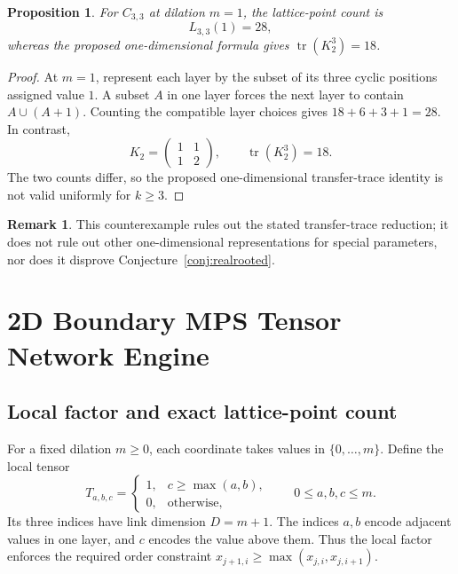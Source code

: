 \documentclass[11pt,a4paper]{article}
\newtheorem{proposition}[theorem]{Proposition}
\theoremstyle{definition}
\newtheorem{remark}[theorem]{Remark}
\begin{document}
\begin{proposition}\label{prop:transfer-counterexample}
For $C_{3,3}$ at dilation $m=1$, the lattice-point count is
\[
L_{3,3}(1)=28,
\]
whereas the proposed one-dimensional formula gives $\operatorname{tr}(K_2^3)=18$.
\end{proposition}

\begin{proof}
At $m=1$, represent each layer by the subset of its three cyclic positions assigned value $1$. A subset $A$ in one layer forces the next layer to contain $A\cup(A+1)$. Counting the compatible layer choices gives $18+6+3+1=28$. In contrast,
\[
K_2=\begin{pmatrix}1&1\\1&2\end{pmatrix},
\qquad \operatorname{tr}(K_2^3)=18.
\]
The two counts differ, so the proposed one-dimensional transfer-trace identity is not valid uniformly for $k\ge3$.
\end{proof}

\begin{remark}
This counterexample rules out the stated transfer-trace reduction; it does not rule out other one-dimensional representations for special parameters, nor does it disprove Conjecture~\ref{conj:realrooted}.
\end{remark}

\section{2D Boundary MPS Tensor Network Engine}

\subsection{Local factor and exact lattice-point count}

For a fixed dilation $m\ge0$, each coordinate takes values in $\{0,\ldots,m\}$. Define the local tensor
\begin{equation}\label{eq:local-tensor}
T_{a,b,c}=
\begin{cases}
1,&c\ge\max(a,b),\\
0,&\text{otherwise},
\end{cases}
\qquad 0\le a,b,c\le m.
\end{equation}
Its three indices have link dimension $D=m+1$. The indices $a,b$ encode adjacent values in one layer, and $c$ encodes the value above them. Thus the local factor enforces the required order constraint $x_{j+1,i}\ge\max(x_{j,i},x_{j,i+1})$.
\end{document}
